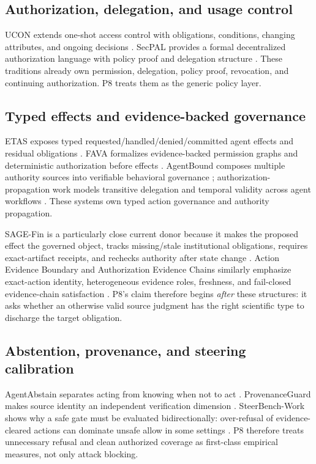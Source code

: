 \documentclass[11pt]{article}
\begin{document}
\subsection{Authorization, delegation, and usage control}
UCON extends one-shot access control with obligations, conditions, changing attributes, and ongoing decisions \cite{ucon2002,ucon2004}. SecPAL provides a formal decentralized authorization language with policy proof and delegation structure \cite{secpal2010}. These traditions already own permission, delegation, policy proof, revocation, and continuing authorization. P8 treats them as the generic policy layer.

\subsection{Typed effects and evidence-backed governance}
ETAS exposes typed requested/handled/denied/committed agent effects and residual obligations \cite{etas2026}. FAVA formalizes evidence-backed permission graphs and deterministic authorization before effects \cite{fava2026}. AgentBound composes multiple authority sources into verifiable behavioral governance \cite{agentbound2026}; authorization-propagation work models transitive delegation and temporal validity across agent workflows \cite{propagation2026}. These systems own typed action governance and authority propagation.

SAGE-Fin is a particularly close current donor because it makes the proposed effect the governed object, tracks missing/stale institutional obligations, requires exact-artifact receipts, and rechecks authority after state change \cite{sagefin2026}. Action Evidence Boundary and Authorization Evidence Chains similarly emphasize exact-action identity, heterogeneous evidence roles, freshness, and fail-closed evidence-chain satisfaction \cite{aeb2026,aec2026}. P8's claim therefore begins \emph{after} these structures: it asks whether an otherwise valid source judgment has the right scientific type to discharge the target obligation.

\subsection{Abstention, provenance, and steering calibration}
AgentAbstain separates acting from knowing when not to act \cite{abstain2026}. ProvenanceGuard makes source identity an independent verification dimension \cite{provguard2026}. SteerBench-Work shows why a safe gate must be evaluated bidirectionally: over-refusal of evidence-cleared actions can dominate unsafe allow in some settings \cite{steerbench2026}. P8 therefore treats unnecessary refusal and clean authorized coverage as first-class empirical measures, not only attack blocking.
\end{document}
